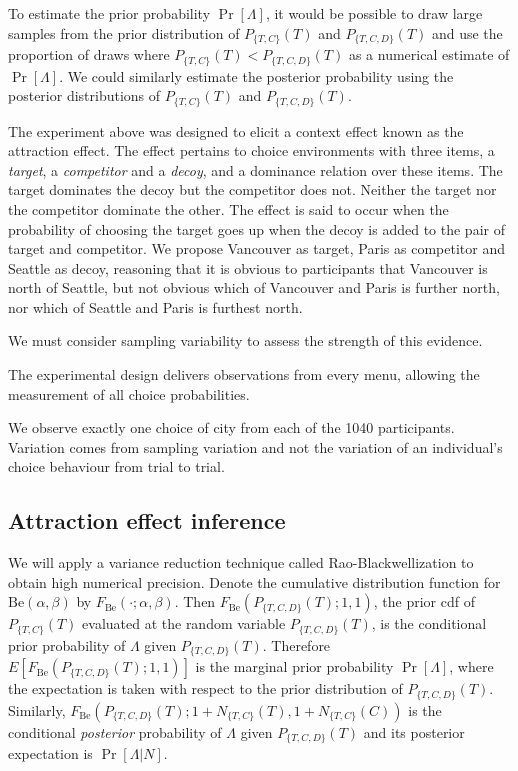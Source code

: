 \documentclass[11pt,letter]{article}
\begin{document}
To estimate the prior probability $\Pr[\Lambda]$, it would be possible to draw large samples from the prior distribution of $P_{\{T,C\}}(T)$ and $P_{\{T,C,D\}}(T)$ and use the proportion of draws where $P_{\{T,C\}}(T) < P_{\{T,C,D\}}(T)$ as a numerical estimate of $\Pr[\Lambda]$.
We could similarly estimate the posterior probability using the posterior distributions of $P_{\{T,C\}}(T)$ and $P_{\{T,C,D\}}(T)$.

The experiment above was designed to elicit a context effect known as the attraction effect.
The effect pertains to choice environments with three items, a {\em target}, a {\em competitor} and a {\em decoy}, and a dominance relation over these items.
The target dominates the decoy but the competitor does not.
Neither the target nor the competitor dominate the other.
The effect is said to occur when the probability of choosing the target goes up when the decoy is added to the pair of target and competitor.
We propose Vancouver as target, Paris as competitor and Seattle as decoy, reasoning that it is obvious to participants that Vancouver is north of Seattle, but not obvious which of Vancouver and Paris is further north, nor which of Seattle and Paris is furthest north.

We must consider sampling variability to assess the strength of this evidence.

The experimental design delivers observations from every menu, allowing the measurement of all choice probabilities.

We observe exactly one choice of city from each of the 1040 participants.
Variation comes from sampling variation and not the variation of an individual's choice behaviour from trial to trial.

\subsection{Attraction effect inference}

We will apply a variance reduction technique called Rao-Blackwellization to obtain high numerical precision.
Denote the cumulative distribution function for $\mathrm{Be}(\alpha, \beta)$ by $F_{\mathrm{Be}}(\cdot;\alpha, \beta)$.
Then $F_{\mathrm{Be}}(P_{\{T,C,D\}}(T); 1, 1)$, the prior cdf of $P_{\{T,C\}}(T)$ evaluated at the random variable $P_{\{T,C,D\}}(T)$, is the conditional prior probability of $\Lambda$ given $P_{\{T,C,D\}}(T)$.
Therefore $E[F_{\mathrm{Be}}(P_{\{T,C,D\}}(T); 1, 1)]$ is the marginal prior probability $\Pr[\Lambda]$, where the expectation is taken with respect to the prior distribution of $P_{\{T,C,D\}}(T)$.
Similarly, $F_{\mathrm{Be}}(P_{\{T,C,D\}}(T); 1 + N_{\{T,C\}}(T), 1 + N_{\{T,C\}}(C))$ is the conditional {\em posterior} probability of $\Lambda$ given $P_{\{T,C,D\}}(T)$ and its posterior expectation is $\Pr[\Lambda|N]$.
\end{document}
